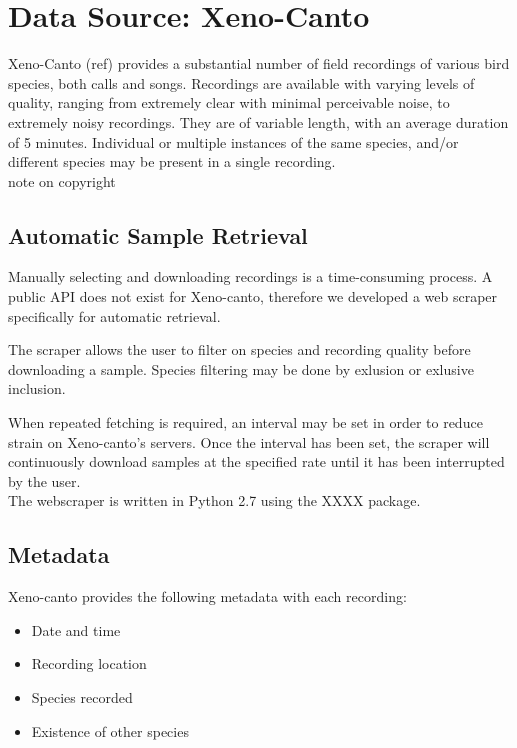 \section{Data Source: Xeno-Canto}

Xeno-Canto (ref) provides a substantial number of field recordings of various
bird species, both calls and songs.
Recordings are available with varying levels of quality, ranging from extremely
clear with minimal perceivable noise, to extremely noisy recordings.
They are of variable length, with an average duration of 5 minutes.
Individual or multiple instances of the same species, and/or
different species may be present in a single recording.\\

note on copyright


\subsection{Automatic Sample Retrieval}
Manually selecting and downloading recordings is a time-consuming process.
A public API does not exist for Xeno-canto, therefore we developed a web scraper
specifically for automatic retrieval.

The scraper allows the user to filter on species and recording quality before
downloading a sample.
Species filtering may be done by exlusion or exlusive inclusion.

When repeated fetching is required, an interval may be set in order to reduce
strain on Xeno-canto's servers.
Once the interval has been set, the scraper will continuously download samples
at the specified rate until it has been interrupted by the user.\\

The webscraper is written in Python 2.7 using the XXXX package.

\subsection{Metadata}
Xeno-canto provides the following metadata with each recording:
\begin{itemize}
  \item Date and time
  \item Recording location
  \item Species recorded
  \item Existence of other species
\end{itemize}

